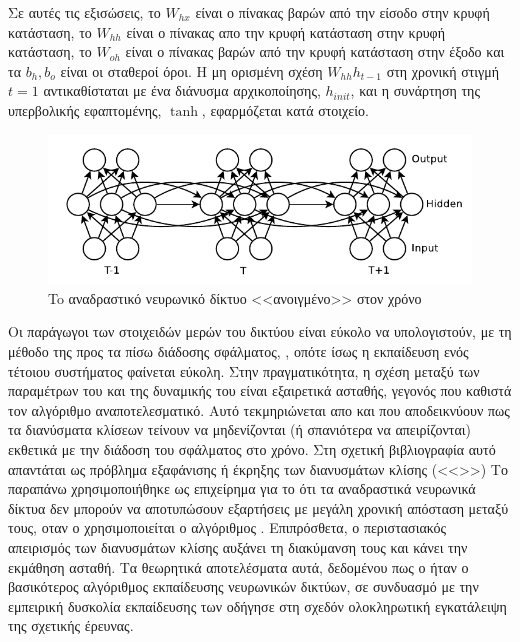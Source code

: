 Σε αυτές τις εξισώσεις, το $W_{hx}$ είναι ο πίνακας βαρών από την είσοδο στην κρυφή κατάσταση, το $W_{hh}$ είναι ο πίνακας απο την κρυφή κατάσταση στην κρυφή κατάσταση, το $W_{oh}$ είναι ο πίνακας βαρών από την κρυφή κατάσταση στην έξοδο και τα $b_h, b_o$ είναι οι σταθεροί όροι.
Η μη ορισμένη σχέση $W_{hh}h_{t-1}$ στη χρονική στιγμή $t = 1$ αντικαθίσταται με ένα διάνυσμα αρχικοποίησης, $h_{init}$, και η συνάρτηση της υπερβολικής εφαπτομένης, $\tanh$, εφαρμόζεται κατά στοιχείο.

\begin{figure}[tph]
	\includegraphics[width=\textwidth, keepaspectratio]{images/rnn.png}
	\centering 
	\caption{To αναδραστικό νευρωνικό δίκτυο <<ανοιγμένο>> στον χρόνο}
	\label{fig:rnn}
\end{figure}

Οι παράγωγοι των στοιχειδών μερών του δικτύου είναι εύκολο να υπολογιστούν, με τη μέθοδο της προς τα πίσω διάδοσης σφάλματος, \cite{Graves2013}, \cite{Rieman2014} οπότε ίσως η εκπαίδευση ενός τέτοιου συστήματος φαίνεται εύκολη.
Στην πραγματικότητα, η σχέση μεταξύ των παραμέτρων του  και της δυναμικής του είναι εξαιρετικά ασταθής, γεγονός που καθιστά τον αλγόριθμο  αναποτελεσματικό.
Αυτό τεκμηριώνεται απο \cite{tofill} και \cite{tofill} που αποδεικνύουν πως τα διανύσματα κλίσεων τείνουν να μηδενίζονται (ή σπανιότερα να απειρίζονται) εκθετικά με την διάδοση του σφάλματος στο χρόνο.
Στη σχετική βιβλιογραφία αυτό απαντάται ως πρόβλημα εξαφάνισης ή έκρηξης των διανυσμάτων κλίσης (<<>>)
Το παραπάνω χρησιμοποιήθηκε ως επιχείρημα για το ότι τα αναδραστικά νευρωνικά δίκτυα δεν μπορούν να αποτυπώσουν εξαρτήσεις με μεγάλη χρονική απόσταση μεταξύ τους, οταν ο χρησιμοποιείται ο αλγόριθμος .
Επιπρόσθετα, ο περιστασιακός απειρισμός των διανυσμάτων κλίσης αυξάνει τη διακύμανση τους και κάνει την εκμάθηση ασταθή.
Τα θεωρητικά αποτελέσματα αυτά, δεδομένου πως ο  ήταν ο βασικότερος αλγόριθμος εκπαίδευσης νευρωνικών δικτύων, σε συνδυασμό με την εμπειρική δυσκολία εκπαίδευσης των  οδήγησε στη σχεδόν ολοκληρωτική εγκατάλειψη της σχετικής έρευνας.

